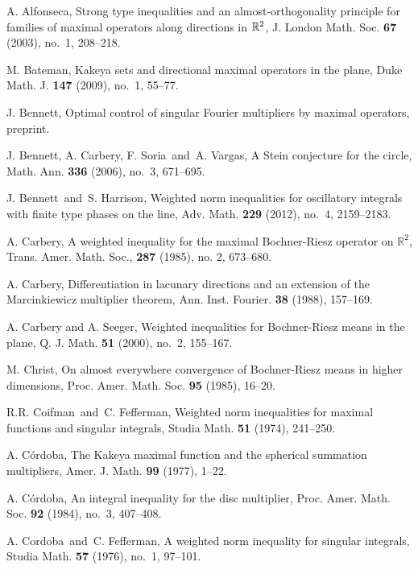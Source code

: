 \documentclass[11pt]{amsart}
\theoremstyle{definition}
\theoremstyle{remark}
\begin{document}
\begin{thebibliography}{99}

 A. Alfonseca, Strong type inequalities and an almost-orthogonality principle for families of maximal operators along directions in $\Bbb R\sp 2$, J. London Math. Soc.  {\bf 67} (2003), no.~1, 208--218.

 M. Bateman, Kakeya sets and directional maximal operators in the plane, Duke Math. J. {\bf 147} (2009), no.~1, 55--77.

 J. Bennett, Optimal control of singular Fourier multipliers by maximal operators, preprint.

 J. Bennett, A. Carbery, F. Soria\ and\ A. Vargas, A Stein conjecture for the circle, Math. Ann. {\bf 336} (2006), no.~3, 671--695.

 J. Bennett\ and\ S. Harrison, Weighted norm inequalities for oscillatory integrals with finite type phases on the line, Adv. Math. {\bf 229} (2012), no.~4, 2159--2183.

 A. Carbery, A weighted inequality for the maximal Bochner-Riesz operator on $\mathbb{R}^2$, {Trans. Amer. Math. Soc.,} {\bf 287} (1985), no. 2, {673--680}.

 A. Carbery, Differentiation in lacunary directions and an extension of the Marcinkiewicz multiplier theorem,
Ann. Inst. Fourier. {\bf 38} (1988), 157--169. 

 A. Carbery and A. Seeger, Weighted inequalities for Bochner-Riesz means in the plane, Q. J. Math. {\bf 51} (2000), no.~2, 155--167.

 M. Christ, On almost everywhere convergence of
Bochner-Riesz means in higher dimensions,  Proc. Amer. Math. Soc.
{\bf 95} (1985),  16--20.

 R.R. Coifman\ and\ C. Fefferman, Weighted norm inequalities for maximal functions and singular integrals, Studia Math. {\bf 51} (1974), 241--250.

 A. C\'ordoba, The Kakeya maximal function and the spherical summation multipliers,
Amer. J. Math. {\bf 99} (1977), 1--22.

 A. C\'ordoba, An integral inequality for the disc multiplier, Proc. Amer. Math. Soc. {\bf 92} (1984), no.~3, 407--408.

 A. Cordoba\ and\ C. Fefferman, A weighted norm inequality for singular integrals, Studia Math. {\bf 57} (1976), no.~1, 97--101.


\end{thebibliography}
\end{document}
